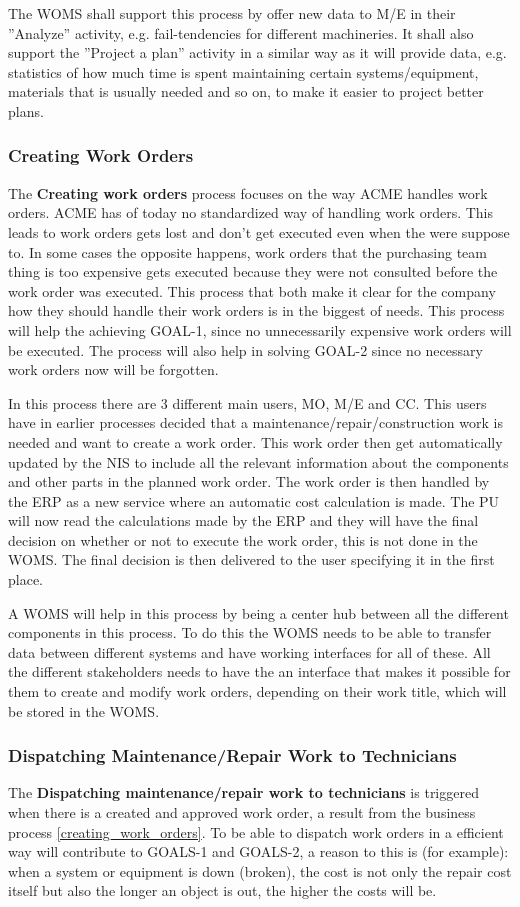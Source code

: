 The WOMS shall support this process by offer new data to M/E in their ''Analyze'' activity, e.g. fail-tendencies for different machineries. It shall also support the ''Project a plan'' activity in a similar way as it will provide data, e.g. statistics of how much time is spent maintaining certain systems/equipment, materials that is usually needed and so on, to make it easier to project better plans.
%
\subsubsection{Creating Work Orders}
\label{sec:bp2}
The \textbf{Creating work orders} process focuses on the way ACME handles work orders. ACME has of today no standardized way of handling work orders. This leads to work orders gets lost and don't get executed even when the were suppose to. In some cases the opposite happens, work orders that the purchasing team thing is too expensive gets executed because they were not consulted before the work order was executed. This process that both make it clear for the company how they should handle their work orders is in the biggest of needs. This process will help the achieving GOAL-1, since no unnecessarily expensive work orders will be executed. The process will also help in solving GOAL-2 since no necessary work orders now will be forgotten. 

In this process there are 3 different main users, MO, M/E and CC. This users have in earlier processes decided that a maintenance/repair/construction work is needed and want to create a work order. This work order then get automatically updated by the NIS to include all the relevant information about the components and other parts in the planned work order. The work order is then handled by the ERP as a new service where an automatic cost calculation is made. The PU will now read the calculations made by the ERP and they will have the final decision on whether or not to execute the work order, this is not done in the WOMS. The final decision is then delivered to the user specifying it in the first place.

A WOMS will help in this process by being a center hub between all the different components in this process. To do this the WOMS needs to be able to transfer data between different systems and have working interfaces for all of these. All the different stakeholders needs to have the an interface that makes it possible for them to create and modify work orders, depending on their work title, which will be stored in the WOMS.
%
\subsubsection{Dispatching Maintenance/Repair Work to Technicians}
\label{sec:bp3}
The \textbf{Dispatching maintenance/repair work to technicians} is triggered when there is a created and approved work order, a result from the business process \ref{creating_work_orders}. To be able to dispatch work orders in a efficient way will contribute to GOALS-1 and GOALS-2, a reason to this is (for example): when a system or equipment is down (broken), the cost is not only the repair cost itself but also the longer an object is out, the higher the costs will be.

